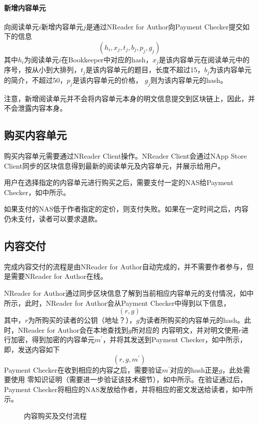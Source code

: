 \paragraph{新增内容单元}
向阅读单元\(i\)新增内容单元\(j\)是通过NReader for Author向Payment Checker提交如下的信息
\[(h_i, x_j, t_j, b_j, p_j, g_j )\]
\noindent 其中\(h_i\)为阅读单元\(i\)在Bookkeeper中对应的hash，\(x_j\)是该内容单元在阅读单元中的序号，按从小到大排列，\(t_j\)是该内容单元的题目，长度不超过15，\(b_j\)为该内容单元的简介，不超过50，\(p_j\)是该内容单元的价格，
\(g_j\)则为该内容单元的hash。

注意，新增阅读单元并不会将内容单元本身的明文信息提交到区块链上，因此，并不会泄露内容本身。

\subsection{购买内容单元}
购买内容单元需要通过NReader Client操作。NReader Client会通过NApp Store Client同步的区块信息得到最新的阅读单元及内容单元，并展示给用户。

用户在选择指定的内容单元进行购买之后，需要支付一定的NAS给Payment Checker，如中所示。

如果支付的NAS低于作者指定的定价，则支付失败。如果在一定时间之后，内容仍未支付，读者可以要求退款。

\subsection{内容交付}
完成内容交付的流程是由NReader for Author自动完成的，并不需要作者参与，但是需要NReader for Author在线。

NReader for Author通过同步区块信息了解到当前相应内容单元的支付情况，如中所示，此时，NReader for Author会从Payment Checker中得到以下信息，
\[(r, g)\]
\noindent 其中，\(r\)为所购买的读者的公钥（地址？），\(g\)为读者所购买的内容单元的hash。此时，NReader for Author会在本地查找到\(g\)所对应的
内容明文，并对明文使用\(r\)进行加密，得到加密的内容单元\(m^{\prime}\)，并将其发送到Payment Checker，如中所示，即，发送内容如下
\[(r, g, m^{\prime})\]
Payment Checker在收到相应的内容之后，需要验证\(m^{\prime}\)对应的hash正是\(g\)，此处需要使用{\color{red} 零知识证明（需要进一步验证该技术细节）}，如中所示。在验证通过后，Payment Checker将相应的NAS发放给作者，并将相应的密文发送给读者，如中所示。

\begin{figure}
\centering

\caption{内容购买及交付流程}
\label{fig:buy}
\end{figure}